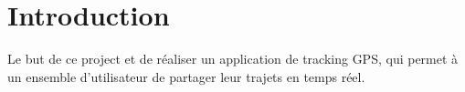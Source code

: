 \documentclass[a4paper]{report}
\begin{document}
\chapter{Introduction}
Le but de ce project et de réaliser un application de tracking GPS, qui 
permet à un ensemble d'utilisateur de partager leur trajets en temps réel.
\end{document}
